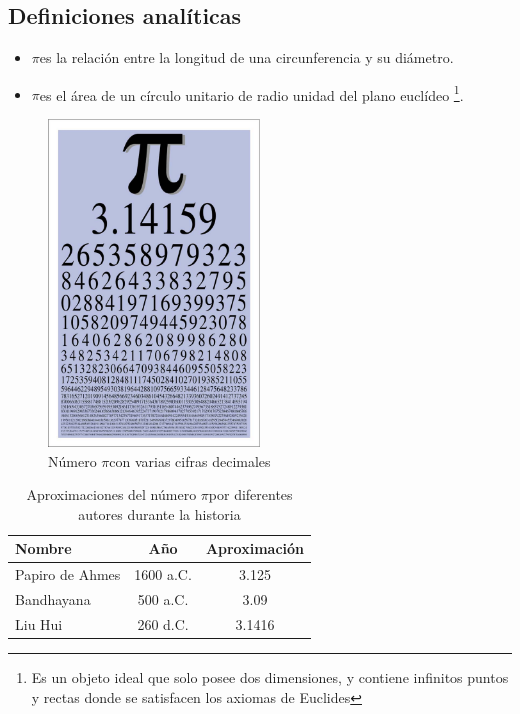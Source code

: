 \documentclass[a4paper,12pt]{article}
\newcommand{\PI}{$\pi$}
\begin{document}
\subsection{Definiciones analíticas}
\begin{itemize}
\item \PI es la relación entre la longitud de una circunferencia y su diámetro.
\item \PI es el área de un círculo unitario de radio unidad del plano euclídeo \footnote{Es un objeto ideal que solo posee dos dimensiones, y contiene infinitos puntos y rectas donde se satisfacen los axiomas de Euclides}.
\end{itemize}
\begin{figure}[htb]
\begin{center}
\includegraphics[width=0.5\textwidth]{images/figura1.eps}
\caption{Número \PI con varias cifras decimales}
\label{Número PI}
\end{center}
\end{figure}
\begin{table}[!ht]
\begin{tabular}{|l|c|c|}
\hline
Nombre & Año & Aproximación\\ \hline
Papiro de Ahmes & 1600 a.C. & 3.125 \\ \hline
Bandhayana & 500 a.C. & 3.09 \\ \hline
Liu Hui & 260 d.C. & 3.1416 \\ \hline
\end{tabular}
\caption{Aproximaciones del número \PI por diferentes autores durante la historia}
\label{tabla}
\cite{educacion}
\end{table}

\begin{thebibliography}{00}

\nocite{*}
\end{thebibliography}
\end{document}
